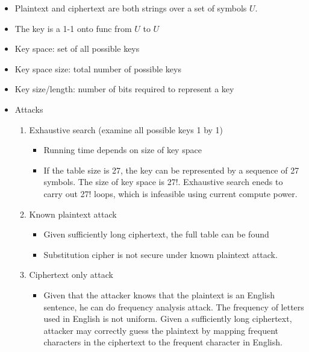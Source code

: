 \documentclass[landscape,a4paper]{extarticle}
\begin{document}
\begin{multicols*}{5}
    \begin{itemize}
        \item Plaintext and ciphertext are both strings over a set of symbols $U$.
        \item The key is a 1-1 onto func from $U$ to $U$
        \item Key space: set of all possible keys
        \item Key space size: total number of possible keys
        \item Key size/length: number of bits required to represent a key
        \item Attacks
        \begin{enumerate}
            \item Exhaustive search (examine all possible keys 1 by 1)
            \begin{itemize}
                \item Running time depends on size of key space
                \item If the table size is 27, the key can be represented by a sequence of 27
                symbols. The size of key space is 27!. Exhaustive search eneds to carry out 27!
                loops, which is infeasible using current compute power.
            \end{itemize}
            \item Known plaintext attack
            \begin{itemize}
                \item Given sufficiently long ciphertext, the full table can be found
                \item Substitution cipher is not secure under known plaintext attack.
            \end{itemize}
            \item Ciphertext only attack
            \begin{itemize}
                \item Given that the attacker knows that the plaintext is an English sentence,
                he can do frequency analysis attack. The frequency of letters used in English is 
                not uniform. Given a sufficiently long ciphertext, attacker may correctly guess the plaintext by 
                mapping frequent characters in the ciphertext to the frequent character in English.
            \end{itemize}
        \end{enumerate}
    \end{itemize}


\end{multicols*}
\end{document}
